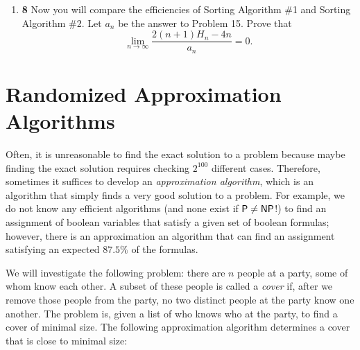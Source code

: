\documentclass[12pt]{article}
\theoremstyle{plain}
\theoremstyle{definition}
\theoremstyle{remark}
\newcommand{\pts}[1]{\lbrack\textbf{#1}\rbrack}
\begin{document}
\begin{enumerate}
\item \pts{8} Now you will compare the efficiencies of Sorting Algorithm \#1 and Sorting Algorithm \#2. Let $a_n$ be the answer to Problem 15. Prove that \[\lim_{n\to\infty}\frac{2(n+1)H_n-4n}{a_n}=0.\]

\begin{comment}\begin{tcolorbox}
Suppose $2^k\le n<2^{k+1}$. We have \begin{align*}H_n&=\frac11+\left(\frac12+\frac13\right)+\left(\frac14+\frac15+\frac16+\frac17\right)+\dots+\left(\frac1{2^k}+\dots+\frac1n\right)\\&\le\frac11+\left(\frac12+\frac12\right)+\left(\frac14+\frac14+\frac14+\frac14\right)+\dots+\left(\frac1{2^k}+\dots+\frac1{2^k}\right)\\&=1+1+1+\dots+\frac{n-2^k+1}{2^k}=k-1+\frac{n+1}{2^k}\le k+1<\log_2n+1\end{align*} Thus, \[\lim_{n\to\infty}\frac{2(n+1)(\log_2n+1)-4n}{n(n-1)/2}=0\] since the numerator grows with $n\log_2n$ and the denominator grows with $n^2$.
\end{tcolorbox}\end{comment}
\end{enumerate}

\section{Randomized Approximation Algorithms}

Often, it is unreasonable to find the exact solution to a problem because maybe finding the exact solution requires checking $2^{100}$ different cases. Therefore, sometimes it suffices to develop an \emph{approximation algorithm}, which is an algorithm that simply finds a very good solution to a problem. For example, we do not know any efficient algorithms (and none exist if ${\sf P}\neq{\sf NP}$!) to find an assignment of boolean variables that satisfy a given set of boolean formulas; however, there is an approximation an algorithm that can find an assignment satisfying an expected $87.5\%$ of the formulas.

We will investigate the following problem: there are $n$ people at a party, some of whom know each other. A subset of these people is called a \emph{cover} if, after we remove those people from the party, no two distinct people at the party know one another. The problem is, given a list of who knows who at the party, to find a cover of minimal size. The following approximation algorithm determines a cover that is close to minimal size:
\end{document}
